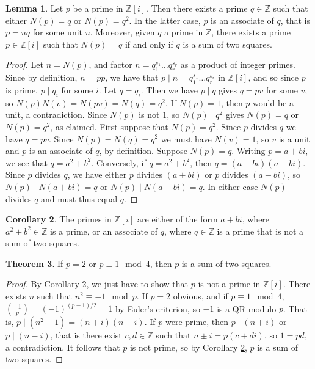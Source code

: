\documentclass{article}
\newcommand{\Z}{\mathbb{Z}}
\newcommand{\rb}[1]{\left( #1 \right)}
\renewcommand{\sb}[1]{\left[ #1 \right]}
\newcommand{\legendre}[2]{\rb{\tfrac{#1}{#2}}}
\theoremstyle{definition}\newtheorem{definition}{Definition}
\theoremstyle{definition}\newtheorem{remark}[definition]{Remark}
\theoremstyle{definition}\newtheorem*{example}{Example}
\theoremstyle{definition}\newtheorem*{note}{Note}
\newtheorem{lemma}[definition]{Lemma}
\newtheorem{theorem}[definition]{Theorem}
\newtheorem{corollary}[definition]{Corollary}
\begin{document}
\begin{lemma}
Let $ p $ be a prime in $ \Z\sb{i} $. Then there exists a prime $ q \in \Z $ such that either $ N\rb{p} = q $ or $ N\rb{p} = q^2 $. In the latter case, $ p $ is an associate of $ q $, that is $ p = uq $ for some unit $ u $. Moreover, given $ q $ a prime in $ \Z $, there exists a prime $ p \in \Z\sb{i} $ such that $ N\rb{p} = q $ if and only if $ q $ is a sum of two squares.
\end{lemma}

\begin{proof}
Let $ n = N\rb{p} $, and factor $ n = q_1^{s_1} \dots q_r^{s_r} $ as a product of integer primes. Since by definition, $ n = p\bar{p} $, we have that $ p \mid n = q_1^{s_1} \dots q_r^{s_r} $ in $ \Z\sb{i} $, and so since $ p $ is prime, $ p \mid q_i $ for some $ i $. Let $ q = q_i $. Then we have $ p \mid q $ gives $ q = pv $ for some $ v $, so $ N\rb{p}N\rb{v} = N\rb{pv} = N\rb{q} = q^2 $. If $ N\rb{p} = 1 $, then $ p $ would be a unit, a contradiction. Since $ N\rb{p} $ is not $ 1 $, so $ N\rb{p} \mid q^2 $ gives $ N\rb{p} = q $ or $ N\rb{p} = q^2 $, as claimed. First suppose that $ N\rb{p} = q^2 $. Since $ p $ divides $ q $ we have $ q = pv $. Since $ N\rb{p} = N\rb{q} = q^2 $ we must have $ N\rb{v} = 1 $, so $ v $ is a unit and $ p $ is an associate of $ q $, by definition. Suppose $ N\rb{p} = q $. Writing $ p = a + bi $, we see that $ q = a^2 + b^2 $. Conversely, if $ q = a^2 + b^2 $, then $ q = \rb{a + bi}\rb{a - bi} $. Since $ p $ divides $ q $, we have either $ p $ divides $ \rb{a + bi} $ or $ p $ divides $ \rb{a - bi} $, so $ N\rb{p} \mid N\rb{a + bi} = q $ or $ N\rb{p} \mid N\rb{a - bi} = q $. In either case $ N\rb{p} $ divides $ q $ and must thus equal $ q $.
\end{proof}

\begin{corollary}
\label{cor:50}
The primes in $ \Z\sb{i} $ are either of the form $ a + bi $, where $ a^2 + b^2 \in \Z $ is a prime, or an associate of $ q $, where $ q \in \Z $ is a prime that is not a sum of two squares.
\end{corollary}

\begin{theorem}
If $ p = 2 $ or $ p \equiv 1 \mod 4 $, then $ p $ is a sum of two squares.
\end{theorem}

\begin{proof}
By Corollary \ref{cor:50}, we just have to show that $ p $ is not a prime in $ \Z\sb{i} $. There exists $ n $ such that $ n^2 \equiv -1 \mod p $. If $ p = 2 $ obvious, and if $ p \equiv 1 \mod 4 $, $ \legendre{-1}{p} = \rb{-1}^{\rb{p - 1} / 2} = 1 $ by Euler's criterion, so $ -1 $ is a QR modulo $ p $. That is, $ p \mid \rb{n^2 + 1} = \rb{n + i}\rb{n - i} $. If $ p $ were prime, then $ p \mid \rb{n + i} $ or $ p \mid \rb{n - i} $, that is there exist $ c, d \in \Z $ such that $ n \pm i = p\rb{c + di} $, so $ 1 = pd $, a contradiction. It follows that $ p $ is not prime, so by Corollary \ref{cor:50}, $ p $ is a sum of two squares.
\end{proof}
\end{document}
